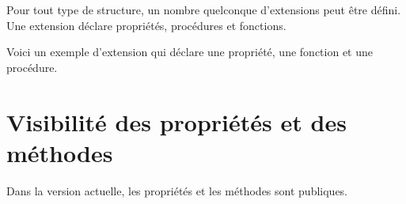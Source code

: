 Pour tout type de structure, un nombre quelconque d'extensions peut être défini. Une extension déclare propriétés, procédures et fonctions.

Voici un exemple d'extension qui déclare une propriété, une fonction et une procédure.







\section{Visibilité des propriétés et des méthodes}

Dans la version actuelle, les propriétés et les méthodes sont publiques.


